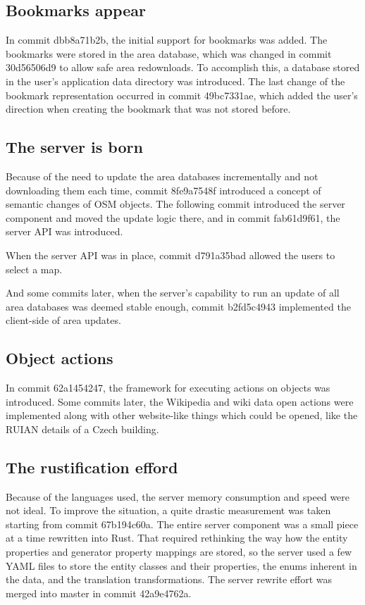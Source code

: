 \documentclass[nolof,digital]{fithesis3}
\begin{document}
\subsection{Bookmarks appear}
In commit dbb8a71b2b, the initial support for bookmarks was added. The bookmarks were stored in the area database, which was changed in commit 30d56506d9 to allow safe area redownloads. To accomplish this, a database stored in the user's application data directory was introduced. The last change of the bookmark representation occurred in commit 49bc7331ae, which added the user's direction when creating the bookmark that was not stored before.
\subsection{The server is born}
Because of the need to update the area databases incrementally and not downloading them each time, commit 8fe9a7548f introduced a concept of semantic changes of OSM objects. The following commit introduced the server component and moved the update logic there, and in commit fab61d9f61, the server API was introduced.

When the server API was in place, commit d791a35bad allowed the users to select a map. 

And some commits later, when the server's capability to run an update of all area databases was deemed stable enough, commit b2fd5c4943 implemented the client-side of area updates.
\subsection{Object actions}
In commit 62a1454247, the framework for executing actions on objects was introduced. Some commits later, the Wikipedia and wiki data open actions were implemented along with other website-like things which could be opened, like the RUIAN details of a Czech building.
\subsection{The rustification efford}
Because of the languages used, the server memory consumption and speed were not ideal. To improve the situation, a quite drastic measurement was taken starting from commit 67b194c60a. The entire server component was a small piece at a time rewritten into Rust. That required rethinking the way how the entity properties and generator property mappings are stored, so the server used a few YAML files to store the entity classes and their properties, the enums inherent in the data, and the translation transformations. The server rewrite effort was merged into master in commit 42a9e4762a.
\end{document}
